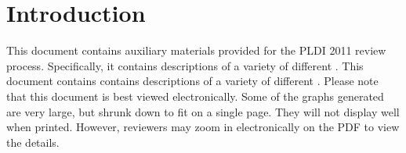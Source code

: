 \ifanon



% 
% 





\fi

\section{Introduction}
\ifanon
This document contains auxiliary materials provided for the PLDI 2011
review process. Specifically, it contains \forest{} descriptions of a
variety of different \filestores{}.
\else
This document contains contains \forest{} descriptions of a
variety of different \filestores{}.
\fi
Please note that this document is best viewed electronically.  Some of
the graphs generated are very large, but shrunk down to fit on a
single page.  They will not display well when
printed.  However, reviewers may zoom in electronically
on the PDF to view the details.


